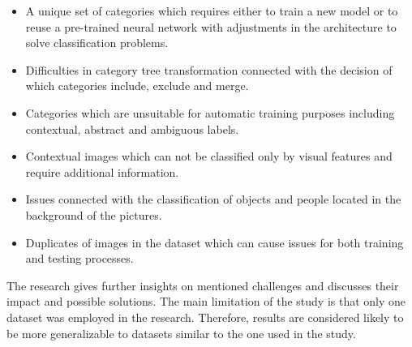 \begin{itemize}
    \item A unique set of categories which requires either to train a new model or to reuse a pre-trained neural network with adjustments in the architecture to solve classification problems.
    \item Difficulties in category tree transformation connected with the decision of which categories include, exclude and merge.
    \item Categories which are unsuitable for automatic training purposes including contextual, abstract and ambiguous labels.
    \item Contextual images which can not be classified only by visual features and require additional information.
    \item Issues connected with the classification of objects and people located in the background of the pictures.
    \item Duplicates of images in the dataset which can cause issues for both training and testing processes.
\end{itemize}

The research gives further insights on mentioned challenges and discusses their impact and possible solutions. The main limitation of the study is that only one dataset was employed in the research. Therefore, results are considered likely to be more generalizable to datasets similar to the one used in the study. 